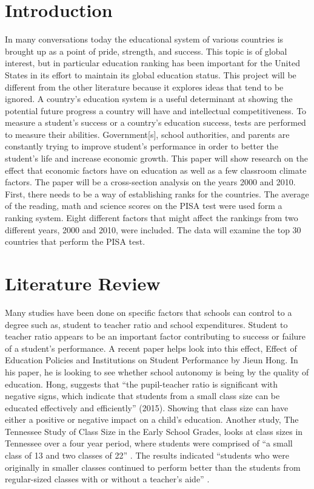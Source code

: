 \documentclass[12pt,english]{article}
\begin{document}
\newpage
\section{Introduction}
In many conversations today the educational system of various countries is brought up as a point of pride, strength, and success. This topic is of global interest, but in particular education ranking has been important for the United States in its effort to maintain its global education status. This project will be different from the other literature because it explores ideas that tend to be ignored. A country's education system is a useful determinant at showing the potential future progress a country will have and intellectual competitiveness. To measure a student's success or a country’s education success, tests are performed to measure their abilities. Government[s], school authorities, and parents are constantly trying to improve student’s performance in order to better the student’s life and increase economic growth. This paper will show research on the effect that economic factors have on education as well as a few classroom climate factors. The paper will be a cross-section analysis on the years 2000 and 2010. First, there needs to be a way of establishing ranks for the countries. The average of the reading, math and science scores on the PISA test were used form a ranking system. Eight different factors that might affect the rankings from two different years, 2000 and 2010, were included. The data will examine the top 30 countries that perform the PISA test.

\section{Literature Review}


Many studies have been done on specific factors that schools can control to a degree such as, student to teacher ratio and school expenditures. Student to teacher ratio appears to be an important factor contributing to success or failure of a student's performance. A recent paper helps look into this effect, Effect of Education Policies and Institutions on Student Performance by Jieun Hong. In his paper, he is looking to see whether school autonomy is being by the quality of education. Hong, suggests that “the pupil-teacher ratio is significant with negative signs, which indicate that students from a small class size can be educated effectively and efficiently” (2015). Showing that class size can have either a positive or negative impact on a child's education. Another study, The Tennessee Study of Class Size in the Early School Grades, looks at class sizes in Tennessee over a four year period, where students were comprised of “a small class of 13 and two classes of 22” \cite{mosteller1995tennessee}. The results indicated “students who were originally in smaller classes continued to perform better than the students from regular-sized classes with or without a teacher’s aide” \cite{mosteller1995tennessee}.
\end{document}
